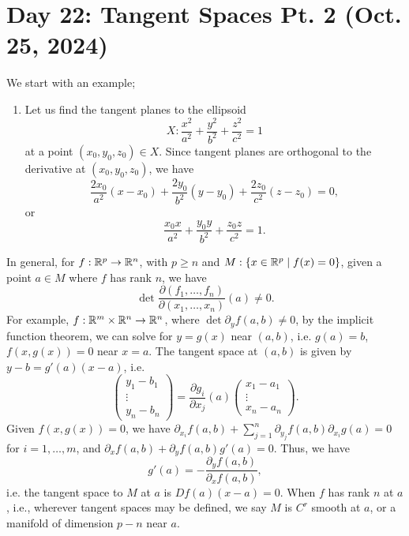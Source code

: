 \section{Day 22: Tangent Spaces Pt. 2 (Oct. 25, 2024)}
We start with an example;
\begin{enumerate}[label=(\alph*)]
    \item Let us find the tangent planes to the ellipsoid
    \[ X : \frac{x^2}{a^2} + \frac{y^2}{b^2} + \frac{z^2}{c^2} = 1 \]
    at a point $(x_0, y_0, z_0) \in X$. Since tangent planes are orthogonal to the derivative at $(x_0, y_0, z_0)$, we have
    \[ \frac{2x_0}{a^2}(x - x_0) + \frac{2y_0}{b^2}(y - y_0) + \frac{2z_0}{c^2}(z - z_0) = 0, \]
    or
    \[ \frac{x_0 x}{a^2} + \frac{y_0 y}{b^2} + \frac{z_0 z}{c^2} = 1. \]
\end{enumerate}
In general, for $f : \mathbb R^p \to \mathbb R^n$, with $p \geq n$ and $M : \{x \in \mathbb R^p \mid f(x) = 0\}$, given a point $a \in M$ where $f$ has rank $n$, we have
\[ \det \frac{\partial(f_1, \dots, f_n)}{\partial (x_1, \dots, x_n)} (a) \neq 0. \]
For example, $f : \mathbb R^m \times \mathbb R^n \to \mathbb R^n$, where $\det \partial_y f(a, b) \neq 0$, by the implicit function theorem, we can solve for $y = g(x)$ near $(a, b)$, i.e. $g(a) = b$, $f(x, g(x)) = 0$ near $x = a$. The tangent space at $(a, b)$ is given by $y - b = g'(a)(x - a)$, i.e.
\[ \begin{pmatrix} y_1 - b_1 \\ \vdots \\ y_n - b_n \end{pmatrix} = \frac{\partial g_i}{\partial x_j}(a) \begin{pmatrix} x_1 - a_1 \\ \vdots \\ x_n - a_n \end{pmatrix}. \]
Given $f(x, g(x)) = 0$, we have $\partial_{x_i} f(a, b) + \sum_{j=1}^n \partial_{y_j} f(a, b) \partial_{x_i} g(a) = 0$ for $i = 1, \dots, m$, and $\partial_x f(a, b) + \partial_y f(a, b) g'(a) = 0$. Thus, we have
\[ g'(a) = -\frac{\partial_y f(a, b)}{\partial_x f(a, b)}, \]
i.e. the tangent space to $M$ at $a$ is $Df(a) (x - a) = 0$. When $f$ has rank $n$ at $a$, i.e., wherever tangent spaces may be defined, we say $M$ is $C^r$ smooth at $a$, or a manifold of dimension $p - n$ near $a$.
